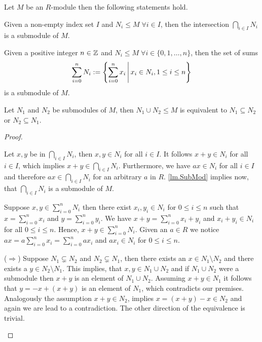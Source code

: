 \begin{lem} \label{lem.submodules}
Let $M$ be an $R$-module then the following statements hold.
\begin{thmlist}
\item Given a non-empty index set $I$ and $N_i\leq M\;\forall i\in I$, then the intersection $\bigcap\limits_{i\in I}N_i$ is a submodule of $M$. \label{lm.IntersectionOfSubmods}
\item Given a positive integer $n\in\operatorname{\mathbb{Z}}$ and $N_i\leq M\;\forall i\in \lbrace 0,1,\ldots,n\rbrace$, then the  set of sums 
\begin{equation*}
\sum\limits_{i=0}^n N_i:=\left\lbrace \sum_{i=0}^nx_i \middle\arrowvert x_i\in N_i, 1 \leq i \leq n\right\rbrace
\end{equation*}
is a submodule of $M$.
\item Let $N_1$ and $N_2$ be submodules of $M$, then $N_1\cup N_2\leq M$ is equivalent to $N_1\subseteq N_2$ or $N_2\subseteq N_1$.
\end{thmlist}
\end{lem}
\begin{proof}
\begin{plist}
\item Let $x,y$ be in $\bigcap_{i\in I}N_i$, then $x,y\in N_i$ for all $i\in I$. It follows $x+y\in N_i$ for all $i\in I$, which implies $x+y\in \bigcap_{i\in I}N_i$. Furthermore, we have $a x \in N_i$ for all $i\in I$ and therefore $a x \in\bigcap_{i\in I}N_i$ for an arbitrary $a$ in $R$. \cref{lm.SubMod} implies now, that $\bigcap_{i\in I}N_i$ is a submodule of $M$.
\item Suppose $x,y\in \sum_{i=0}^n N_i$ then there exist $x_i,y_i\in N_i$ for $0\leq i\leq n$ such that $x=\sum_{i=0}^{n}x_i$ and $y=\sum_{i=0}^{n}y_i$. We have $x+y=\sum_{i=0}^{n}x_i+y_i$ and $x_i+y_i\in N_i$ for all $0\leq i\leq n$. Hence, $x+y\in \sum_{i=0}^n N_i$. Given an $a\in R$ we notice $ax=a\sum_{i=0}^{n}x_i=\sum_{i=0}^{n}ax_i$ and $ax_i\in N_i$ for $0\leq i\leq n$.
\item ($\Rightarrow$) Suppose $N_1\subsetneq N_2$ and $N_2\subsetneq N_1$, then there exists an $x\in N_1\setminus N_2$ and there exists a $y\in N_2\setminus N_1$. This implies, that $x,y\in N_1\cup N_2$ and if $N_1\cup N_2$ were a submodule then $x+y$ is an element of $N_1\cup N_2$. Assuming $x+y\in N_1$ it follows that $y=-x+(x+y)$ is an element of $N_1$, which contradicts our premises. Analogously the assumption $x+y\in N_2$, implies $x=(x+y)-x\in N_2$ and again we are lead to a contradiction. The other direction of the equivalence is trivial.
\end{plist}
\end{proof}